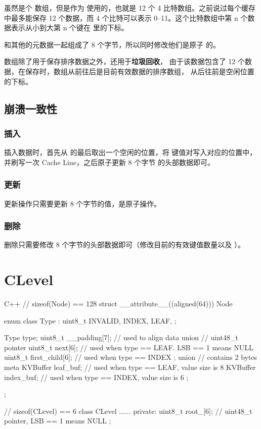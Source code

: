 \documentclass{mydoc}
\begin{document}
 虽然是个  数组，但是作为 
使用的，也就是 12 个 4 比特数组。之前说过每个缓存中最多能保存 12 个数据，而 4
个比特可以表示 0--11。这个比特数组中第 n 个数据表示从小到大第 n 个键在 
里的下标。

 和其他的元数据一起组成了 8 个字节，所以同时修改他们是原子
的。

 数组除了用于保存排序数据之外，还用于\textbf{垃圾回收}，
由于该数据包含了 12 个数据，在保存时，数组从前往后是目前有效数据的排序数组，
从后往前是空闲位置的下标。

\subsection{崩溃一致性}

\subsubsection{插入}

插入数据时，首先从  的最后取出一个空闲的位置，将
键值对写入对应的位置中，并刷写一次 Cache Line，之后原子更新 8 个字节
的头部数据即可。

\subsubsection{更新}

更新操作只需要更新 8 个字节的值，是原子操作。

\subsubsection{删除}

删除只需要修改 8 个字节的头部数据即可（修改目前的有效键值数量以及 ）。

\section{CLevel}

\begin{codes}{C++}
// sizeof(Node) == 128
struct __attribute__((aligned(64))) Node {
  enum class Type : uint8_t {
    INVALID,
    INDEX,
    LEAF,
  };

  Type type;
  uint8_t __padding[7]; // used to align data
  union {
    // uint48_t pointer
    uint8_t next[6];    // used when type == LEAF. LSB == 1 means NULL
    uint8_t first_child[6]; // used when type == INDEX
  };
  union {
    // contains 2 bytes meta
    KVBuffer leaf_buf;  // used when type == LEAF, value size is 8
    KVBuffer index_buf; // used when type == INDEX, value size is 6
  };
};

// sizeof(CLevel) == 6
class CLevel {
  ......
 private:
  uint8_t root_[6]; // uint48_t pointer, LSB == 1 means NULL
};
\end{codes}
\end{document}
